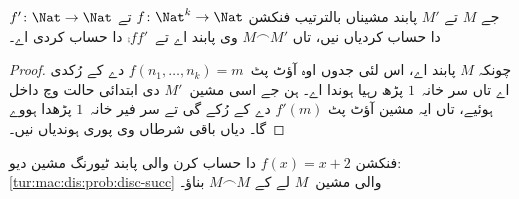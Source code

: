 \documentclass[../../../include/open-logic-section]{subfiles}
\begin{document}
\begin{prop}
    جے $M$ تے $M'$ پابند مشیناں
    بالترتیب فنکشن $f\colon
    \Nat^k \to \Nat$ تے $f'\colon \Nat \to \Nat$
    دا حساب کردیاں نیں، تاں
    $M \frown M'$ وی پابند اے
    تے~$\comp{f}{f'}$ دا حساب کردی اے۔
\end{prop}

\begin{proof}
    چونکہ $M$ پابند اے، اس لئی
    جدوں اوہ آؤٹ پٹ~$f(n_1,\dots,n_k) = m$
    دے کے رُکدی اے تاں سر خانہ~$1$
    پڑھ رہیا ہوندا اے۔ ہن جے اسی
    مشین~$M'$ دی ابتدائی حالت وچ
    داخل ہوئیے، تاں ایہ مشین آؤٹ پٹ
    $f'(m)$ دے کے رُکے گی تے سر فیر
    خانہ~$1$ پڑھدا ہووے گا۔
     دیاں
    باقی شرطاں وی پوری ہوندیاں نیں۔
\end{proof}

\begin{prob}
    فنکشن $f(x) = x+2$ دا حساب کرن
    والی پابند ٹیورنگ مشین دیو:
    \cref{tur:mac:dis:prob:disc-succ} والی
    مشین~$M$ لے کے $M \frown M$ بناؤ۔
\end{prob}
\end{document}
